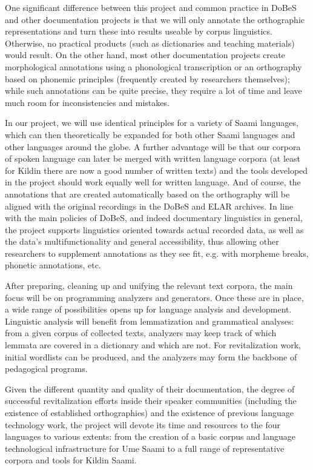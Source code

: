 \documentclass[a4paper,12pt]{article}
\begin{document}
One significant difference between this project and common practice in DoBeS and other documentation projects is that we will only annotate the orthographic representations and turn these into results useable by corpus linguistics. Otherwise, no practical products (such as dictionaries and teaching materials) would result. On the other hand, most other documentation projects create morphological annotations using a phonological transcription or an orthography based on phonemic principles (frequently created by researchers themselves); while such annotations can be quite precise, they require a lot of time and leave much room for inconsistencies and mistakes.

In our project, we will use identical principles for a variety of Saami languages, which can then theoretically be expanded for both other Saami languages and other languages around the globe. A further advantage will be that our corpora of spoken language can later be merged with written language corpora (at least for Kildin there are now a good number of written texts) and the tools developed in the project should work equally well for written language. And of course, the annotations that are created automatically based on the orthography will be aligned with the original recordings in the DoBeS and ELAR archives. In line with the main policies of DoBeS, and indeed documentary linguistics in general, the project supports linguistics oriented towards actual recorded data, as well as the data's multifunctionality and general accessibility, thus allowing other researchers to supplement annotations as they see fit, e.g. with morpheme breaks, phonetic annotations, etc.

After preparing, cleaning up and unifying the relevant text corpora, the main focus will be on programming analyzers and generators. Once these are in place, a wide range of possibilities opens up for language analysis and development. Linguistic analysis will benefit from lemmatization and grammatical analyses: from a given corpus of collected texts, analyzers may keep track of which lemmata are covered in a dictionary and which are not. For revitalization work, initial wordlists can be produced, and the analyzers may form the backbone of pedagogical programs.

Given the different quantity and quality of their documentation, the degree of successful revitalization efforts inside their speaker communities (including the existence of established orthographies) and the existence of previous language technology work, the project will devote its time and resources to the four languages to various extents: from the creation of a basic corpus and language technological infrastructure for Ume Saami to a full range of representative corpora and tools for Kildin Saami.
\end{document}
